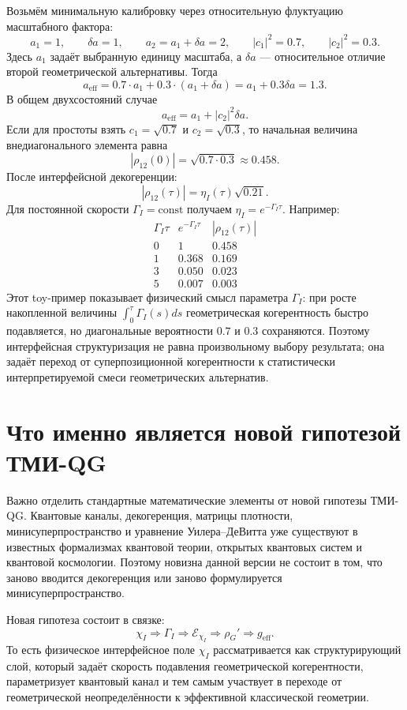 \documentclass[12pt,a4paper]{article}
\newcommand{\Eff}{\mathrm{eff}}
\begin{document}
Возьмём минимальную калибровку через относительную флуктуацию масштабного фактора:
\[
\boxed{
a_1=1,
\qquad
\delta a=1,
\qquad
a_2=a_1+\delta a=2,
\qquad
|c_1|^2=0.7,
\qquad
|c_2|^2=0.3.
}
\]
Здесь $a_1$ задаёт выбранную единицу масштаба, а $\delta a$ --- относительное отличие второй геометрической альтернативы. Тогда
\[
\boxed{
a_{\Eff}=0.7\cdot a_1+0.3\cdot(a_1+\delta a)=a_1+0.3\delta a=1.3.
}
\]
В общем двухсостояний случае
\[
\boxed{
a_{\Eff}=a_1+|c_2|^2\delta a.
}
\]
Если для простоты взять $c_1=\sqrt{0.7}$ и $c_2=\sqrt{0.3}$, то начальная величина внедиагонального элемента равна
\[
\boxed{
|\rho_{12}(0)|=\sqrt{0.7\cdot0.3}\approx0.458.
}
\]
После интерфейсной декогеренции:
\[
\boxed{
|\rho_{12}(\tau)|=\eta_I(\tau)\sqrt{0.21}.
}
\]
Для постоянной скорости $\Gamma_I=\mathrm{const}$ получаем $\eta_I=e^{-\Gamma_I\tau}$. Например:
\[
\begin{array}{c|c|c}
\Gamma_I\tau & e^{-\Gamma_I\tau} & |\rho_{12}(\tau)| \\
\hline
0 & 1 & 0.458 \\
1 & 0.368 & 0.169 \\
3 & 0.050 & 0.023 \\
5 & 0.007 & 0.003
\end{array}
\]
Этот toy-пример показывает физический смысл параметра $\Gamma_I$: при росте накопленной величины $\int_0^\tau\Gamma_I(s)ds$ геометрическая когерентность быстро подавляется, но диагональные вероятности $0.7$ и $0.3$ сохраняются. Поэтому интерфейсная структуризация не равна произвольному выбору результата; она задаёт переход от суперпозиционной когерентности к статистически интерпретируемой смеси геометрических альтернатив.

\section{Что именно является новой гипотезой ТМИ-QG}

Важно отделить стандартные математические элементы от новой гипотезы ТМИ-QG. Квантовые каналы, декогеренция, матрицы плотности, минисуперпространство и уравнение Уилера--ДеВитта уже существуют в известных формализмах квантовой теории, открытых квантовых систем и квантовой космологии. Поэтому новизна данной версии не состоит в том, что заново вводится декогеренция или заново формулируется минисуперпространство.

Новая гипотеза состоит в связке:
\[
\boxed{
\chi_I
\Rightarrow
\Gamma_I
\Rightarrow
\mathcal E_{\chi_I}
\Rightarrow
\rho_G'
\Rightarrow
 g_{\Eff}.
}
\]
То есть физическое интерфейсное поле $\chi_I$ рассматривается как структурирующий слой, который задаёт скорость подавления геометрической когерентности, параметризует квантовый канал и тем самым участвует в переходе от геометрической неопределённости к эффективной классической геометрии.
\end{document}

